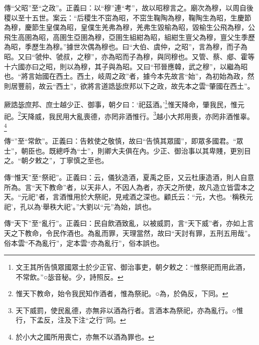 {\noindent\zhuan{}\fzbyks 傳“父昭”至“之政”。正義曰：以“穆”連“考”，故以昭穆言之。廟次為穆，以周自後稷以至十五世。案云：“后稷生不窋為昭，不窋生鞠陶為穆，鞠陶生為昭，生慶節為穆，慶節生皇僕為昭，皇僕生羌弗為穆，羌弗生毀榆為昭，毀榆生公飛為穆，公飛生高圉為昭，高圉生亞圉為穆，亞圉生組紺為昭，組紺生亶父為穆，亶父生季歷為昭，季歷生為穆。”據世次偶為穆也。曰“大伯、虞仲，之昭”，言為穆，而子為昭。又曰“虢仲、虢叔，之穆”，亦為昭而子為穆，與同穆也。又管、蔡、郕、霍等十六國亦曰之昭，則以為穆，其子與為昭。又曰“邗晉應韓，武之穆”，以繼為昭也。“將言始國在西土。西土，岐周之政”者，據今本先故言“始”，為初始為政，然則居豐前，故云“西土”，欲將言道誥毖庶邦以下之政，故先本之雲“肇國在西土”。 \par}

厥誥毖庶邦、庶士越少正、御事，朝夕曰：‘祀茲酒。’\footnote{文王其所告慎眾國眾士於少正官、御治事吏，朝夕敕之：“惟祭祀而用此酒，不常飲。”○毖音秘。少，詩照反。}惟天降命，肇我民，惟元祀。\footnote{惟天下教命，始令我民知作酒者，惟為祭祀。○為，於偽反，下同。}天降威，我民用大亂喪德，亦罔非酒惟行。\footnote{天下威罰，使民亂德，亦無非以酒為行者。言酒本為祭祀，亦為亂行。○惟行，下孟反，注及下注“之行”同。}越小大邦用喪，亦罔非酒惟辜。\footnote{於小大之國所用喪亡，亦無不以酒為罪也。}

{\noindent\zhuan{}\fzbyks 傳“”至“常飲”。正義曰：告敕使之敬慎，故曰“告慎其眾國”，即眾多國君。“眾士”，朝臣也。既總呼為“士”，則卿大夫俱在內。少正、御治事以其卑賤，更別目之。“朝夕敕之”，丁寧慎之至也。 \par}

{\noindent\zhuan{}\fzbyks 傳“惟天”至“祭祀”。正義曰：云，儀狄造酒，夏禹之臣，又云杜康造酒，則人自意所為。言“天下教命”者，以天非人，不因人為者，亦天之所使，故凡造立皆雲本之天。“元祀”者，言酒惟用於大祭祀，見戒酒之深也。顧氏云：“元，大也。‘稱秩元祀’，孔以為‘舉秩大祀’。”大劉以“元”為始，誤也。 \par}

{\noindent\zhuan{}\fzbyks 傳“天下”至“亂行”。正義曰：民自飲酒致亂，以被威罰，言“天下威”者，亦如上言天之下教命，令民作酒也。為亂而罪，天理當然，故曰“天討有罪，五刑五用哉”。俗本雲“不為亂行”，定本雲“亦為亂行”，俗本誤也。 \par}

